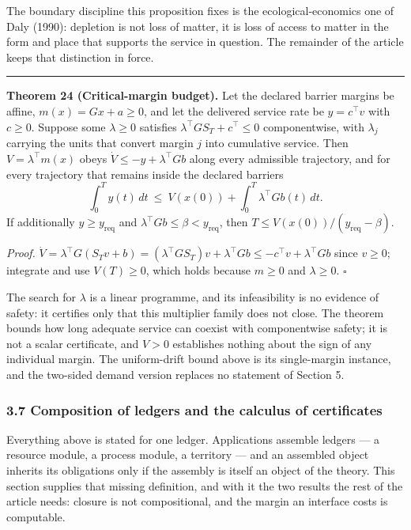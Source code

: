 \documentclass[11pt]{article}
\begin{document}
The boundary discipline this proposition fixes is the
ecological-economics one of Daly (1990): depletion is not loss of
matter, it is loss of access to matter in the form and place that
supports the service in question. The remainder of the article keeps
that distinction in force.

\begin{center}\rule{0.5\linewidth}{0.5pt}\end{center}

\textbf{Theorem 24 (Critical-margin budget).} Let the declared barrier margins be affine,
\(m(x)=Gx+a\ge0\), and let the delivered service rate be \(y=c^{\top}v\) with \(c\ge0\). Suppose some
\(\lambda\ge0\) satisfies \(\lambda^{\top}GS_T+c^{\top}\le0\) componentwise, with \(\lambda_j\)
carrying the units that convert margin \(j\) into cumulative service. Then \(V=\lambda^{\top}m(x)\)
obeys \(\dot V\le-y+\lambda^{\top}Gb\) along every admissible trajectory, and for every trajectory
that remains inside the declared barriers
\[ \int_0^Ty(t)\,dt\ \le\ V(x(0))+\int_0^T\lambda^{\top}Gb(t)\,dt . \]
If additionally \(y\ge y_{\mathrm{req}}\) and \(\lambda^{\top}Gb\le\beta<y_{\mathrm{req}}\), then
\(T\le V(x(0))/(y_{\mathrm{req}}-\beta)\).

\emph{Proof.} \(\dot V=\lambda^{\top}G(S_Tv+b)=(\lambda^{\top}GS_T)v+\lambda^{\top}Gb\le -c^{\top}v+\lambda^{\top}Gb\) since \(v\ge0\); integrate and use \(V(T)\ge0\), which holds because
\(m\ge0\) and \(\lambda\ge0\). \ensuremath{\square}

The search for \(\lambda\) is a linear programme, and its infeasibility is no evidence of safety: it
certifies only that this multiplier family does not close. The theorem bounds how long adequate
service can coexist with componentwise safety; it is not a scalar certificate, and \(V>0\)
establishes nothing about the sign of any individual margin. The uniform-drift bound above is its
single-margin instance, and the two-sided demand version replaces no statement of Section 5.



\subsubsection{3.7 Composition of ledgers and the calculus of certificates}\label{composition-of-ledgers-and-the-calculus-of-certificates}

Everything above is stated for one ledger. Applications assemble ledgers --- a resource module, a
process module, a territory --- and an assembled object inherits its obligations only if the
assembly is itself an object of the theory. This section supplies that missing definition, and with it
the two results the rest of the article needs: closure is not compositional, and the margin an
interface costs is computable.
\end{document}
